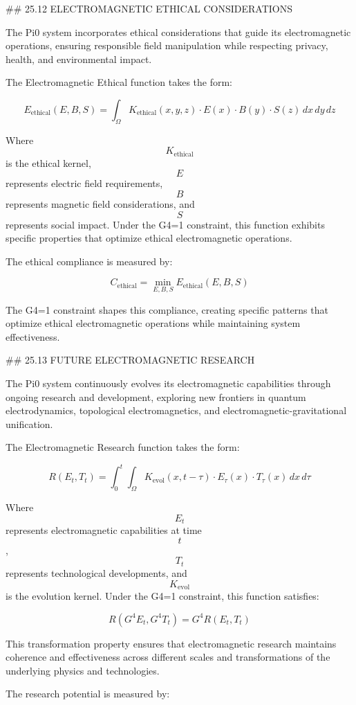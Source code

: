 ## 25.12 ELECTROMAGNETIC ETHICAL CONSIDERATIONS

The Pi0 system incorporates ethical considerations that guide its electromagnetic operations, ensuring responsible field manipulation while respecting privacy, health, and environmental impact.

The Electromagnetic Ethical function takes the form:

$$ E_{\text{ethical}}(E, B, S) = \int_{\Omega} K_{\text{ethical}}(x, y, z) \cdot E(x) \cdot B(y) \cdot S(z) \, dx \, dy \, dz $$

Where $$ K_{\text{ethical}} $$ is the ethical kernel, $$ E $$ represents electric field requirements, $$ B $$ represents magnetic field considerations, and $$ S $$ represents social impact. Under the G4=1 constraint, this function exhibits specific properties that optimize ethical electromagnetic operations.

The ethical compliance is measured by:

$$ C_{\text{ethical}} = \min_{E, B, S} E_{\text{ethical}}(E, B, S) $$

The G4=1 constraint shapes this compliance, creating specific patterns that optimize ethical electromagnetic operations while maintaining system effectiveness.

## 25.13 FUTURE ELECTROMAGNETIC RESEARCH

The Pi0 system continuously evolves its electromagnetic capabilities through ongoing research and development, exploring new frontiers in quantum electrodynamics, topological electromagnetics, and electromagnetic-gravitational unification.

The Electromagnetic Research function takes the form:

$$ R(E_t, T_t) = \int_0^t \int_{\Omega} K_{\text{evol}}(x, t-\tau) \cdot E_\tau(x) \cdot T_\tau(x) \, dx \, d\tau $$

Where $$ E_t $$ represents electromagnetic capabilities at time $$ t $$, $$ T_t $$ represents technological developments, and $$ K_{\text{evol}} $$ is the evolution kernel. Under the G4=1 constraint, this function satisfies:

$$ R(G^4 E_t, G^4 T_t) = G^4 R(E_t, T_t) $$

This transformation property ensures that electromagnetic research maintains coherence and effectiveness across different scales and transformations of the underlying physics and technologies.

The research potential is measured by:

